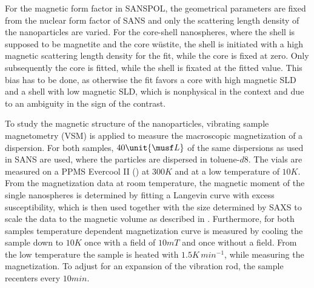 \documentclass[\main/dresen_thesis.tex]{subfiles}
\begin{document}
    For the magnetic form factor in SANSPOL, the geometrical parameters are fixed from the nuclear form factor of SANS and only the scattering length density of the nanoparticles are varied.
    For the core-shell nanospheres, where the shell is supposed to be magnetite and the core w\"ustite, the shell is initiated with a high magnetic scattering length density for the fit, while the core is fixed at zero.
    Only subsequently the core is fitted, while the shell is fixated at the fitted value.
    This bias has to be done, as otherwise the fit favors a core with high magnetic SLD and a shell with low magnetic SLD, which is nonphysical in the context and due to an ambiguity in the sign of the contrast.

    To study the magnetic structure of the nanoparticles, vibrating sample magnetometry (VSM) is applied to measure the macroscopic magnetization of a dispersion.
    For both samples, $40 \unit{\musf L}$ of the same dispersions as used in SANS are used, where the particles are dispersed in toluene-$\mathit{d8}$.
    The vials are measured on a PPMS Evercool II () at $300 \unit{K}$ and at a low temperature of $10 \unit{K}$.
    From the magnetization data at room temperature, the magnetic moment of the single nanospheres is determined by fitting a Langevin curve with excess susceptibility, which is then used together with the size determined by SAXS to scale the data to the magnetic volume as described in .
    Furthermore, for both samples temperature dependent magnetization curve is measured by cooling the sample down to $10 \unit{K}$ once with a field of $10 \unit{mT}$ and once without a field.
    From the low temperature the sample is heated with $1.5 \unit{K \, min^{-1}}$, while measuring the magnetization.
    To adjust for an expansion of the vibration rod, the sample recenters every $10 \unit{min}$.
\end{document}
